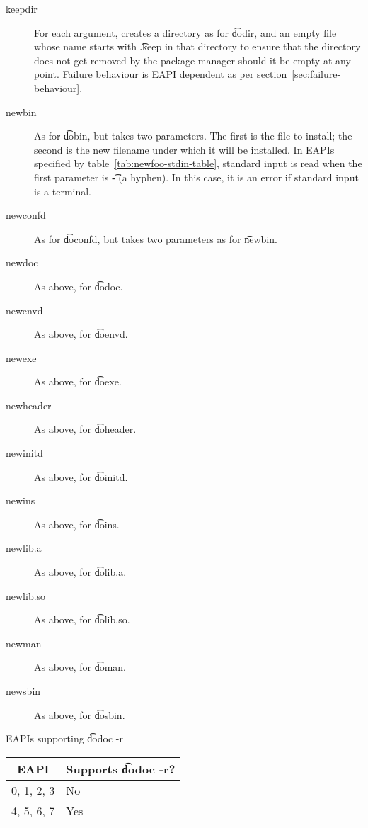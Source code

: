 \begin{description}
\item[keepdir] For each argument, creates a directory as for \t{dodir}, and an empty file whose
    name starts with \t{.keep} in that directory to ensure that the directory does not get removed
    by the package manager should it be empty at any point. Failure behaviour is EAPI dependent
    as per section~\ref{sec:failure-behaviour}.

\item[newbin]  As for \t{dobin}, but takes two parameters. The first is
    the file to install; the second is the new filename under which it will be installed. In EAPIs
    specified by table~\ref{tab:newfoo-stdin-table}, standard input is read when the first
    parameter is \t{-} (a hyphen). In this case, it is an error if standard input is a terminal.

\item[newconfd] As for \t{doconfd}, but takes two parameters as for \t{newbin}.

\item[newdoc] As above, for \t{dodoc}.

\item[newenvd] As above, for \t{doenvd}.

\item[newexe] As above, for \t{doexe}.

\item[newheader] As above, for \t{doheader}.

\item[newinitd] As above, for \t{doinitd}.

\item[newins] As above, for \t{doins}.

\item[newlib.a] As above, for \t{dolib.a}.

\item[newlib.so] As above, for \t{dolib.so}.

\item[newman] As above, for \t{doman}.

\item[newsbin] As above, for \t{dosbin}.

\end{description}

\begin{centertable}{EAPIs supporting \t{dodoc -r}}
    \label{tab:dodoc-table}
    \begin{tabular}{ll}
      \toprule
      \multicolumn{1}{c}{\textbf{EAPI}} &
      \multicolumn{1}{c}{\textbf{Supports \t{dodoc -r}?}} \\
      \midrule
      0, 1, 2, 3        & No  \\
      4, 5, 6, 7        & Yes \\
      \bottomrule
    \end{tabular}
\end{centertable}

